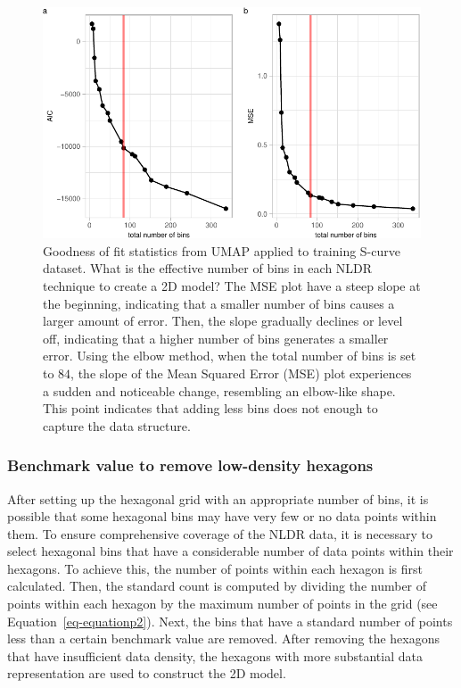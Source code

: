 \documentclass[
  12pt]{article}
\begin{document}
\begin{figure}

{\centering \includegraphics{paper_files/figure-pdf/fig-diagnosticpltScurve-1.pdf}

}

\caption{\label{fig-diagnosticpltScurve}Goodness of fit statistics from
UMAP applied to training S-curve dataset. What is the effective number
of bins in each NLDR technique to create a 2D model? The MSE plot have a
steep slope at the beginning, indicating that a smaller number of bins
causes a larger amount of error. Then, the slope gradually declines or
level off, indicating that a higher number of bins generates a smaller
error. Using the elbow method, when the total number of bins is set to
\(84\), the slope of the Mean Squared Error (MSE) plot experiences a
sudden and noticeable change, resembling an elbow-like shape. This point
indicates that adding less bins does not enough to capture the data
structure.}

\end{figure}

\hypertarget{benchmark-value-to-remove-low-density-hexagons}{%
\subsubsection{Benchmark value to remove low-density
hexagons}\label{benchmark-value-to-remove-low-density-hexagons}}

After setting up the hexagonal grid with an appropriate number of bins,
it is possible that some hexagonal bins may have very few or no data
points within them. To ensure comprehensive coverage of the NLDR data,
it is necessary to select hexagonal bins that have a considerable number
of data points within their hexagons. To achieve this, the number of
points within each hexagon is first calculated. Then, the standard count
is computed by dividing the number of points within each hexagon by the
maximum number of points in the grid (see Equation~\ref{eq-equationp2}).
Next, the bins that have a standard number of points less than a certain
benchmark value are removed. After removing the hexagons that have
insufficient data density, the hexagons with more substantial data
representation are used to construct the 2D model.
\end{document}
